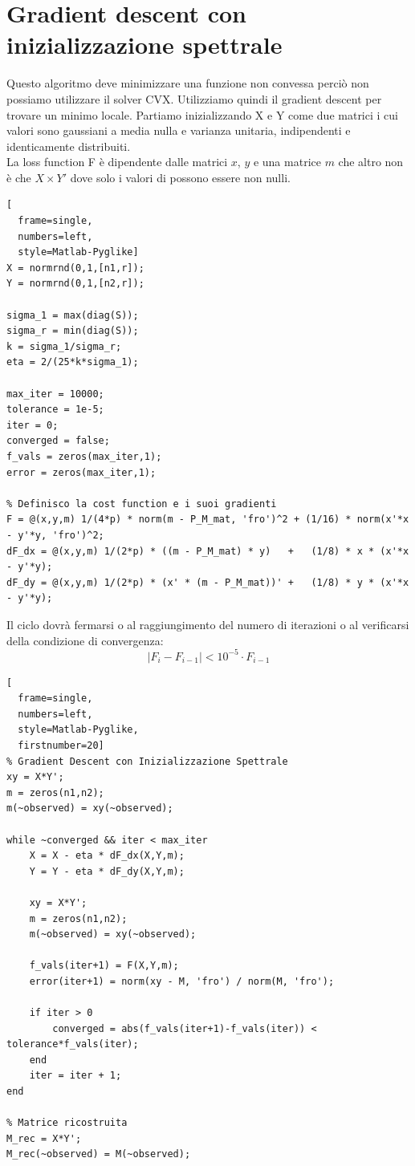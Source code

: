 \documentclass[12pt,a4paper]{report}
\begin{document}
\newpage

\section{Gradient descent con inizializzazione spettrale}

Questo algoritmo deve minimizzare una funzione non convessa perciò
non possiamo utilizzare il solver CVX.
Utilizziamo quindi il gradient descent per trovare un minimo locale.
Partiamo inizializzando X e Y come due matrici i cui valori
sono gaussiani a media nulla e varianza unitaria, indipendenti
e identicamente distribuiti.\\
La loss function F è dipendente dalle matrici
$x$, $y$ e una matrice $m$ che altro non è che $X\times Y'$
dove solo i valori di  possono essere non nulli.\\

\begin{lstlisting}[
  frame=single,
  numbers=left,
  style=Matlab-Pyglike]
X = normrnd(0,1,[n1,r]);
Y = normrnd(0,1,[n2,r]);

sigma_1 = max(diag(S));
sigma_r = min(diag(S));
k = sigma_1/sigma_r;
eta = 2/(25*k*sigma_1);

max_iter = 10000;
tolerance = 1e-5;
iter = 0;
converged = false;
f_vals = zeros(max_iter,1);
error = zeros(max_iter,1);

% Definisco la cost function e i suoi gradienti
F = @(x,y,m) 1/(4*p) * norm(m - P_M_mat, 'fro')^2 + (1/16) * norm(x'*x - y'*y, 'fro')^2;
dF_dx = @(x,y,m) 1/(2*p) * ((m - P_M_mat) * y)   +   (1/8) * x * (x'*x - y'*y);
dF_dy = @(x,y,m) 1/(2*p) * (x' * (m - P_M_mat))' +   (1/8) * y * (x'*x - y'*y);

\end{lstlisting}
Il ciclo dovrà fermarsi o al raggiungimento del numero di
iterazioni  o al verificarsi
della condizione di convergenza:
$$ |F_i - F_{i-1}| < 10^{-5} \cdot F_{i-1} $$

\begin{lstlisting}[
  frame=single,
  numbers=left,
  style=Matlab-Pyglike,
  firstnumber=20]
% Gradient Descent con Inizializzazione Spettrale
xy = X*Y';
m = zeros(n1,n2);
m(~observed) = xy(~observed);

while ~converged && iter < max_iter
    X = X - eta * dF_dx(X,Y,m);
    Y = Y - eta * dF_dy(X,Y,m);

    xy = X*Y';
    m = zeros(n1,n2);
    m(~observed) = xy(~observed);

    f_vals(iter+1) = F(X,Y,m);
    error(iter+1) = norm(xy - M, 'fro') / norm(M, 'fro');

    if iter > 0
        converged = abs(f_vals(iter+1)-f_vals(iter)) < tolerance*f_vals(iter);
    end
    iter = iter + 1;
end

% Matrice ricostruita
M_rec = X*Y';
M_rec(~observed) = M(~observed);
\end{lstlisting}
\end{document}
